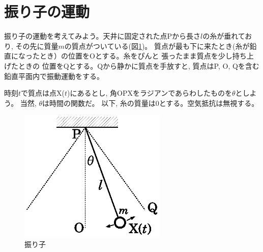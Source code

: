 \section{振り子の運動}

振り子の運動を考えてみよう。天井に固定された点Pから長さ$l$の糸が垂れており, 
その先に質量$m$の質点がついている(図\ref{fig:pendulum})。
質点が最も下に来たとき(糸が鉛直になったとき）の位置をOとする。糸をぴんと
張ったまま質点を少し持ち上げたときの
位置をQとする。Qから静かに質点を手放すと, 質点はP, O, Qを含む鉛直平面内で振動運動をする。

時刻$t$で質点は点X($t$)にあるとし, 角OPXをラジアンであらわしたものを$\theta$としよう。
当然, $\theta$は時間の関数だ。
以下, 糸の質量は0とする。空気抵抗は無視する。\mv
\begin{figure}[h]
    \centering
    \includegraphics[width=7cm]{pendulum.eps}
    \caption{振り子}\label{fig:pendulum}
\end{figure}

